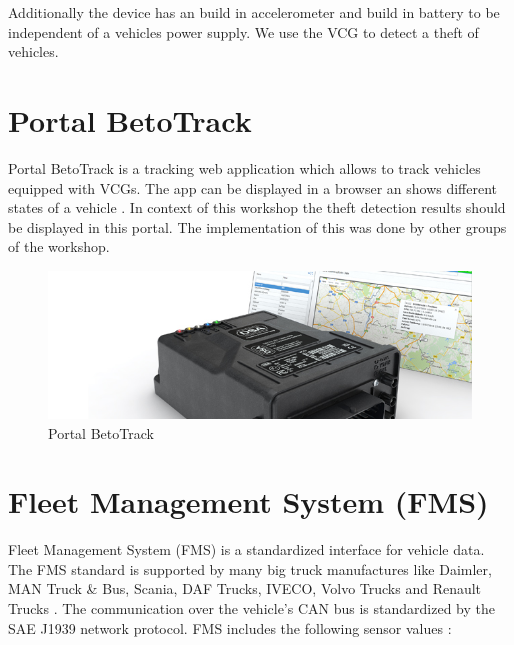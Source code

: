 Additionally the device has an build in accelerometer and build in battery to be independent of a vehicles power supply. We use the VCG to detect a theft of vehicles.

\section{Portal BetoTrack}

Portal BetoTrack is a tracking web application which allows to track vehicles equipped with VCGs. The app can be displayed in a browser an shows different states of a vehicle \cite{BetoTrack}. 
In context of this workshop the theft detection results should be displayed in this portal. The implementation of this was done by other groups of the workshop.

\begin{figure}[h]
    \includegraphics[width=1.0\textwidth]{src/pic/betotrack_630x220px.jpg}
    \caption{Portal BetoTrack \cite{BetoTrack}} 
\end{figure}

\section{Fleet Management System (FMS)}
\label{sec::FMSDef}

Fleet Management System (FMS) is a standardized interface for vehicle data. The FMS standard is supported by many big truck manufactures like Daimler, MAN Truck \& Bus, Scania, DAF Trucks, IVECO, Volvo Trucks and Renault Trucks \cite{FMS}.
The communication over the vehicle's CAN bus is standardized by the SAE J1939 network protocol.
FMS includes the following sensor values \cite{FMSStd}:

